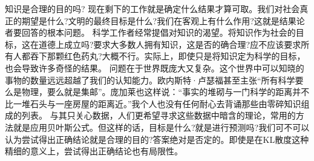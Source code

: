 知识是合理的目的吗?
现在剩下的工作就是确定什么结果才算可取。我们对社会真正的期望是什么?文明的最终目标是什么?我们在客观上有什么作用?这就是结果论者要回答的根本问题。
科学工作者经常提倡对知识的渴望。将知识作为社会的目标，这在道德上成立吗?要求大多数人拥有知识，这是否的确合理?应不应该要求所有人都吞下那颗红色药丸?大概不行。实际上，即使只是将知识定为科学的目标，也会导致许多奇怪的结果。
问题在于世界既庞大又复杂。这个世界中可以知晓的事物的数量远远超越了我们的认知能力。欧内斯特·卢瑟福甚至主张“所有科学要么是物理，要么就是集邮”。庞加莱也这样说：“事实的堆砌与一门科学的距离并不比一堆石头与一座房屋的距离近。”我个人也没有任何耐心去背诵那些由零碎知识组成的列表。
与其只关心数据，人们更希望寻求这些数据中暗含的理论，常用的方法就是应用贝叶斯公式。但这样的话，目标是什么?就是进行预测吗?我们可不可以认为尝试得出正确结论就是合理的目的?答案绝对是否定的。即使是在KL散度这种精细的意义上，尝试得出正确结论也有局限性。


